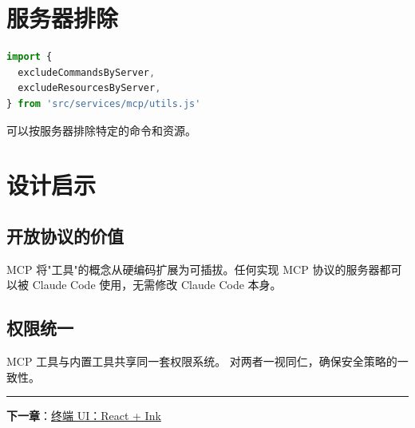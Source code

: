 \section{服务器排除}

\begin{lstlisting}[language=TypeScript,breaklines=true]
import {
  excludeCommandsByServer,
  excludeResourcesByServer,
} from 'src/services/mcp/utils.js'
\end{lstlisting}

可以按服务器排除特定的命令和资源。

\section{设计启示}

\subsection{开放协议的价值}

MCP 将"工具"的概念从硬编码扩展为可插拔。任何实现 MCP 协议的服务器都可以被 Claude Code 使用，无需修改 Claude Code 本身。

\subsection{权限统一}

MCP 工具与内置工具共享同一套权限系统。 对两者一视同仁，确保安全策略的一致性。

\bigskip\noindent\rule{\textwidth}{0.4pt}\bigskip

\textbf{下一章}：\href{./chapter-12-terminal-ui.md}{终端 UI：React + Ink}
